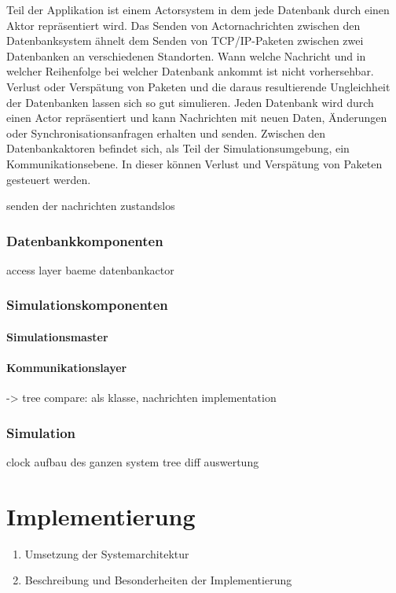 \documentclass[a4paper,11pt,oneside,%
headsepline,												%
footsepline,												%
bibtotocnumbered									%
]{scrreprt}
\begin{document}
Teil der Applikation ist einem Actorsystem in dem jede Datenbank durch einen Aktor repräsentiert wird.
Das Senden von Actornachrichten zwischen den Datenbanksystem ähnelt dem Senden von TCP/IP-Paketen zwischen zwei Datenbanken an verschiedenen Standorten. Wann welche Nachricht und in welcher Reihenfolge bei welcher Datenbank ankommt ist nicht vorhersehbar. Verlust oder Verspätung von Paketen und die daraus resultierende Ungleichheit der Datenbanken lassen sich so gut simulieren.
Jeden Datenbank wird durch einen Actor repräsentiert und kann Nachrichten mit neuen Daten, Änderungen oder Synchronisationsanfragen erhalten und senden. Zwischen den Datenbankaktoren befindet sich, als Teil der Simulationsumgebung, ein Kommunikationsebene. In dieser können  Verlust und Verspätung von Paketen gesteuert werden.


senden der nachrichten zustandslos

\subsection{Datenbankkomponenten}
access layer
baeme
datenbankactor

\subsection{Simulationskomponenten}	
\subsubsection{Simulationsmaster}
\subsubsection{Kommunikationslayer}

-> tree compare: als klasse, nachrichten implementation	
		
\subsection{Simulation}
clock
aufbau des ganzen system
tree diff
auswertung
\chapter{Implementierung}
		\begin{enumerate}[1.]
			\item Umsetzung der Systemarchitektur
			\item Beschreibung und Besonderheiten der Implementierung
		\end{enumerate}
\end{document}
